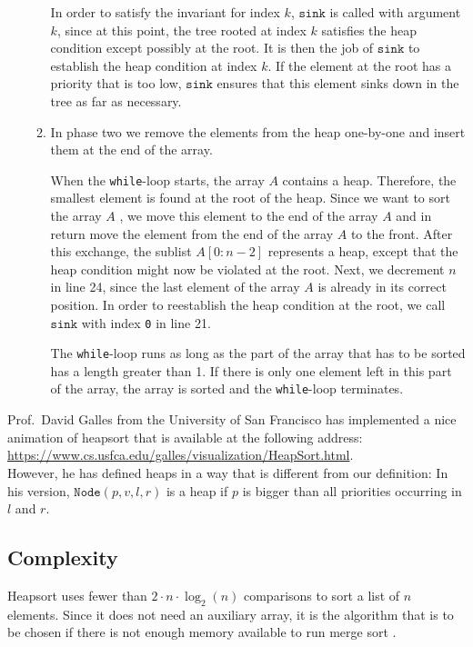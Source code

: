 \begin{enumerate}
\begin{enumerate}
            In order to satisfy the invariant for index ${k}$, $\texttt{sink}$ is called with
            argument ${k}$,  since at this point, the tree rooted at index ${k}$ satisfies
            the heap condition except possibly at the root.  It is then the job of $\texttt{sink}$ to
            establish the heap condition at index ${k}$.  If the element at the root has a
            priority that is too low, $\texttt{sink}$ ensures that this element sinks down in the tree
            as far as necessary.
      \item In phase two we remove the elements from the heap one-by-one and insert them at the end of
            the array.

            When the \texttt{while}-loop starts, the array ${A}$ contains a heap.  Therefore,
            the smallest element is found at the root of the heap.  Since we want to sort the
            array ${A}$ , we move this element to the end of the array ${A}$ and in
            return move the element from the end of the array ${A}$ to the front.
            After this exchange, the sublist $A[0:n-2]$ represents a heap, except that the
            heap condition might now be violated at the root.  Next, we decrement ${n}$ in line 24, since the
            last element of the array ${A}$ is already in its correct position.  
            In order to reestablish the heap condition at the root, we call $\texttt{sink}$ with index
            \texttt{0} in line 21.

            The \texttt{while}-loop runs as long as the part of the array that has to be sorted has
            a length greater than 1.  If there is only one element left in this part of the array, the array is
            sorted and the \texttt{while}-loop terminates.
      \end{enumerate}
\end{enumerate}
Prof.~David Galles from the University of San Francisco has implemented a nice animation of heapsort that is
available at the following address:
\\[0.2cm]
\hspace*{1.3cm}
\href{https://www.cs.usfca.edu/~galles/visualization/HeapSort.html}{https://www.cs.usfca.edu/galles/visualization/HeapSort.html}.
\\[0.2cm] 
However, he has defined heaps in a way that is different from our definition:  In his version,
$\texttt{Node}(p, v, l, r)$ is a heap if $p$ is bigger than all priorities occurring in $l$ and $r$.

\subsection{Complexity}
Heapsort uses fewer than $2 \cdot n \cdot \log_2(n)$ comparisons to sort a list of $n$ elements.  Since it does
not need an auxiliary array, it is the algorithm that is to be chosen if there is not enough memory available
to run merge sort \cite{sedgewick:2011}.  



